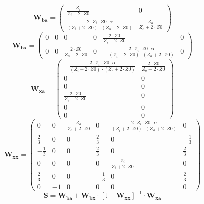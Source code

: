 \[ \mathbf{W_{ba}} = \left(\begin{smallmatrix} \frac{Z_i}{Z_i+2\cdot Z0} & 0 \\ \frac{2\cdot Z_i\cdot Z0\cdot \alpha}{\left(Z_i+2\cdot Z0\right)\cdot\left(Z_o+2\cdot Z0\right)} & \frac{Z_o}{Z_o+2\cdot Z0} \end{smallmatrix}\right) \]
\[ \mathbf{W_{bx}} = \left(\begin{smallmatrix} 0 & 0 & 0 & 0 & \frac{2\cdot Z0}{Z_i+2\cdot Z0} & 0 \\ 0 & 0 & \frac{2\cdot Z0}{Z_o+2\cdot Z0} & 0 & -\frac{2\cdot Z_i\cdot Z0\cdot \alpha}{\left(Z_i+2\cdot Z0\right)\cdot\left(Z_o+2\cdot Z0\right)} & 0 \end{smallmatrix}\right) \]
\[ \mathbf{W_{xa}} = \left(\begin{smallmatrix} -\frac{2\cdot Z_i\cdot Z0\cdot \alpha}{\left(Z_i+2\cdot Z0\right)\cdot\left(Z_o+2\cdot Z0\right)} & \frac{2\cdot Z0}{Z_o+2\cdot Z0} \\ 0 & 0 \\ 0 & 0 \\ \frac{2\cdot Z0}{Z_i+2\cdot Z0} & 0 \\ 0 & 0 \\ 0 & 0 \end{smallmatrix}\right) \]
\[ \mathbf{W_{xx}} = \left(\begin{smallmatrix} 0 & 0 & \frac{Z_o}{Z_o+2\cdot Z0} & 0 & \frac{2\cdot Z_i\cdot Z0\cdot \alpha}{\left(Z_i+2\cdot Z0\right)\cdot\left(Z_o+2\cdot Z0\right)} & 0 \\ \frac{2}{3} & 0 & 0 & \frac{2}{3} & 0 & -\frac{1}{3} \\ -\frac{1}{3} & 0 & 0 & \frac{2}{3} & 0 & \frac{2}{3} \\ 0 & 0 & 0 & 0 & \frac{Z_i}{Z_i+2\cdot Z0} & 0 \\ \frac{2}{3} & 0 & 0 & -\frac{1}{3} & 0 & \frac{2}{3} \\ 0 & -1 & 0 & 0 & 0 & 0 \end{smallmatrix}\right) \]
\[ \mathbf{S}=\mathbf{W_{ba}}+\mathbf{W_{bx}}\cdot\left[ \mathbb{I}  -\mathbf{W_{xx}}\right]^{-1}\cdot\mathbf{W_{xa}} \]
